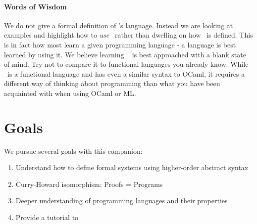 \paragraph{Words of Wisdom}
We do not give a formal definition of \beluga's language.  Instead  we are looking at examples and highlight how to \emph{use} \beluga~rather than dwelling on how \beluga~is defined. This is in fact how most learn a given programming language - a language is best learned by using it. We believe learning \beluga~ is best approached with a blank state of mind. Try not to compare it to functional languages you already know. While \beluga~is a functional language and has even a similar syntax to OCaml,  it requires a different way of thinking about programming than what you have been acquainted with when using OCaml or ML.



\section{Goals}
We pursue several goals with this companion:

\begin{enumerate}
\item Understand how to define formal systems using higher-order abstract syntax
\item Curry-Howard isomorphism: Proofs = Programs
\item Deeper understanding of programming languages and their properties
\item Provide a tutorial to \beluga
\end{enumerate}





